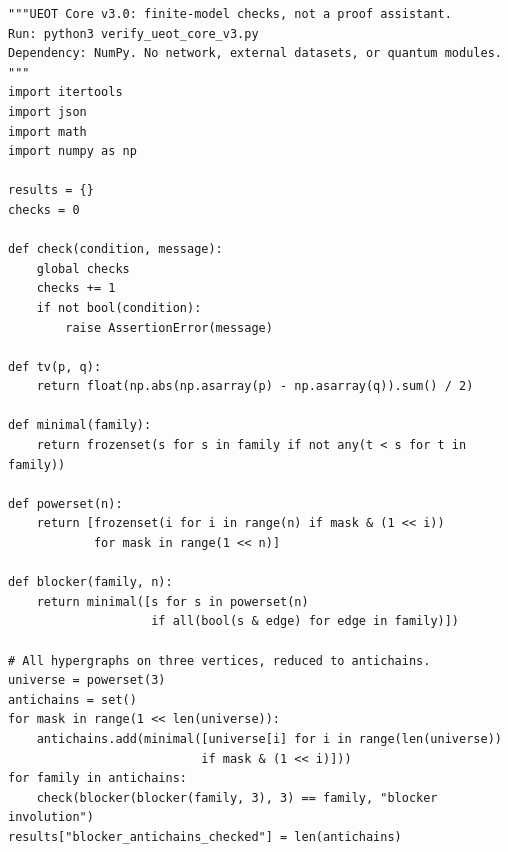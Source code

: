 \documentclass[
  11pt,
  oneside]{book}
\begin{document}
\begin{verbatim}
"""UEOT Core v3.0: finite-model checks, not a proof assistant.
Run: python3 verify_ueot_core_v3.py
Dependency: NumPy. No network, external datasets, or quantum modules.
"""
import itertools
import json
import math
import numpy as np

results = {}
checks = 0

def check(condition, message):
    global checks
    checks += 1
    if not bool(condition):
        raise AssertionError(message)

def tv(p, q):
    return float(np.abs(np.asarray(p) - np.asarray(q)).sum() / 2)

def minimal(family):
    return frozenset(s for s in family if not any(t < s for t in family))

def powerset(n):
    return [frozenset(i for i in range(n) if mask & (1 << i))
            for mask in range(1 << n)]

def blocker(family, n):
    return minimal([s for s in powerset(n)
                    if all(bool(s & edge) for edge in family)])

# All hypergraphs on three vertices, reduced to antichains.
universe = powerset(3)
antichains = set()
for mask in range(1 << len(universe)):
    antichains.add(minimal([universe[i] for i in range(len(universe))
                           if mask & (1 << i)]))
for family in antichains:
    check(blocker(blocker(family, 3), 3) == family, "blocker involution")
results["blocker_antichains_checked"] = len(antichains)


\end{verbatim}
\end{document}
